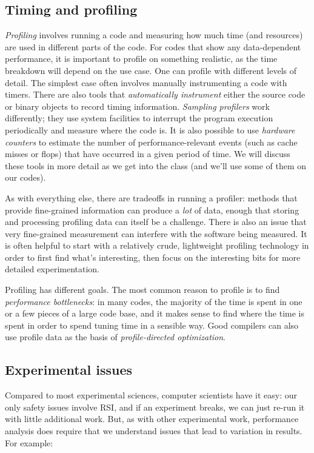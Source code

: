 \documentclass[12pt, leqno]{article} %
\begin{document}
\subsection{Timing and profiling}

\emph{Profiling} involves running a code and measuring how much time
(and resources) are used in different parts of the code. For codes that
show any data-dependent performance, it is important to profile on
something realistic, as the time breakdown will depend on the use case.
One can profile with different levels of detail. The simplest case often
involves manually instrumenting a code with timers. There are also tools
that \emph{automatically instrument} either the source code or binary
objects to record timing information. \emph{Sampling profilers} work
differently; they use system facilities to interrupt the program
execution periodically and measure where the code is. It is also
possible to use \emph{hardware counters} to estimate the number of
performance-relevant events (such as cache misses or flops) that have
occurred in a given period of time. We will discuss these tools in more
detail as we get into the class (and we'll use some of them on our
codes).

As with everything else, there are tradeoffs in running a profiler:
methods that provide fine-grained information can produce a \emph{lot}
of data, enough that storing and processing profiling data can itself be
a challenge. There is also an issue that very fine-grained measurement
can interfere with the software being measured. It is often helpful to
start with a relatively crude, lightweight profiling technology in order
to first find what's interesting, then focus on the interesting bits for
more detailed experimentation.

Profiling has different goals. The most common reason to profile is to
find \emph{performance bottlenecks}: in many codes, the majority of the
time is spent in one or a few pieces of a large code base, and it makes
sense to find where the time is spent in order to spend tuning time in a
sensible way. Good compilers can also use profile data as the basis of
\emph{profile-directed optimization}.

\subsection{Experimental issues}

Compared to most experimental sciences, computer scientists have it
easy: our only safety issues involve RSI, and if an experiment breaks,
we can just re-run it with little additional work. But, as with other
experimental work, performance analysis does require that we understand
issues that lead to variation in results. For example:
\end{document}
